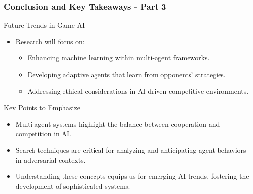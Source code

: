\documentclass[aspectratio=169]{beamer}
\begin{document}
\begin{frame}[fragile]
  \frametitle{Conclusion and Key Takeaways - Part 3}
  \begin{block}{Future Trends in Game AI}
    \begin{itemize}
      \item Research will focus on:
        \begin{itemize}
          \item Enhancing machine learning within multi-agent frameworks.
          \item Developing adaptive agents that learn from opponents' strategies.
          \item Addressing ethical considerations in AI-driven competitive environments.
        \end{itemize}
    \end{itemize}
  \end{block}

  \begin{block}{Key Points to Emphasize}
    \begin{itemize}
      \item Multi-agent systems highlight the balance between cooperation and competition in AI.
      \item Search techniques are critical for analyzing and anticipating agent behaviors in adversarial contexts.
      \item Understanding these concepts equips us for emerging AI trends, fostering the development of sophisticated systems.
    \end{itemize}
  \end{block}
\end{frame}
\end{document}
